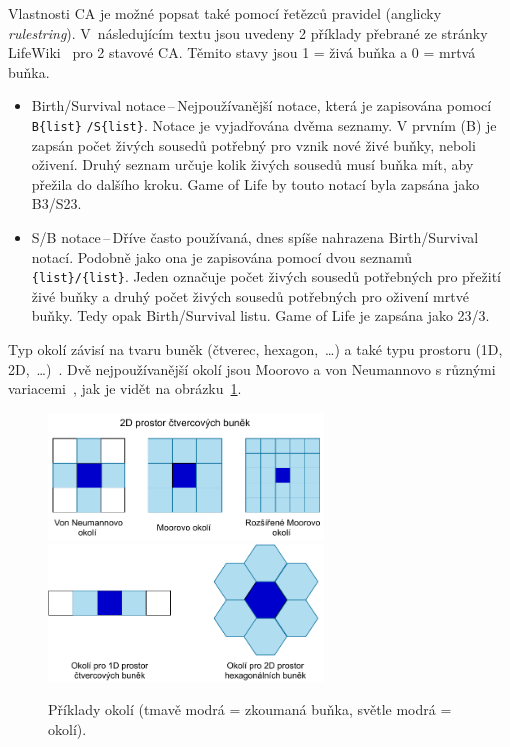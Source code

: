Vlastnosti CA je možné popsat také pomocí řetězců pravidel (anglicky \textit{rulestring}). V~následujícím textu jsou uvedeny 2 příklady přebrané ze stránky LifeWiki~\cite{LifeWiki} pro 2 stavové CA. Těmito stavy jsou 1 = živá buňka a 0 = mrtvá buňka. 
\begin{itemize}
    \item Birth/Survival notace\,--\,Nejpoužívanější notace, která je zapisována pomocí \verb|B{list}| \verb|/S{list}|. Notace je vyjadřována dvěma seznamy. V prvním (B) je zapsán počet živých sousedů potřebný pro vznik nové živé buňky, neboli oživení. Druhý seznam určuje kolik živých sousedů musí buňka mít, aby přežila do dalšího kroku. Game of Life by touto notací byla zapsána jako B3/S23.
    \item S/B notace\,--\,Dříve často používaná, dnes spíše nahrazena Birth/Survival notací. Podobně jako ona je zapisována pomocí dvou seznamů \verb|{list}|\verb|/{list}|. Jeden označuje počet živých sousedů potřebných pro přežití živé buňky a druhý počet živých sousedů potřebných pro oživení mrtvé buňky. Tedy opak Birth/Survival listu. Game of Life je zapsána jako 23/3.
\end{itemize}

Typ okolí závisí na tvaru buněk (čtverec, hexagon,~\ldots) a také typu prostoru (1D, 2D,~\ldots)~\cite{ims}. Dvě nejpoužívanější okolí jsou Moorovo a von Neumannovo s různými variacemi~\cite{sloot2004cellular}, jak je vidět na obrázku~\ref{fig:2D-okoli}.
\begin{figure}[H]
    \centering
    \includegraphics[width=0.65\textwidth]{obrazky-figures/ch2/2D-okoli.pdf}\hspace{0.5cm}
    \includegraphics[width=0.65\textwidth]{obrazky-figures/ch2/jina-okoli.pdf}
    \caption{Příklady okolí (tmavě modrá = zkoumaná buňka, světle modrá = okolí).}
    \label{fig:2D-okoli}
\end{figure}

